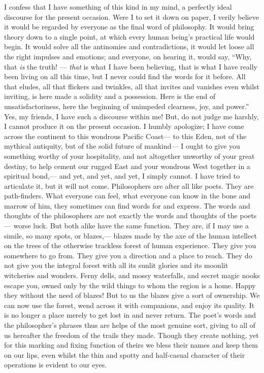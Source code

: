 \documentclass[12pt]{article}
\begin{document}
I confess that I have something of this kind in my mind, a perfectly ideal discourse for the present occasion. Were I to set it down on paper, I verily believe it would be regarded by everyone as the final word of philosophy. It would bring theory down to a single point, at which every human being's practical life would begin. It would solve all the antinomies and contradictions, it would let loose all the right impulses and emotions; and everyone, on hearing it, would say, ``Why, that \emph{is} the truth! --- \emph{that} is what I have been believing, that is what I have really been living on all this time, but I never could find the words for it before. All that eludes, all that flickers and twinkles, all that invites and vanishes even whilst inviting, is here made a solidity and a possession. Here is the end of unsatisfactoriness, here the beginning of unimpeded clearness, joy, and power.'' Yes, my friends, I have such a discourse within me! But, do not judge me harshly, I cannot produce it on the present occasion. I humbly apologize; I have come across the continent to this wondrous Pacific Coast--- to this Eden, not of the mythical antiquity, but of the solid future of mankind--- I ought to give you something worthy of your hospitality, and not altogether unworthy of your great destiny, to help cement our rugged East and your wondrous West together in a spiritual bond,--- and yet, and yet, and yet, I simply cannot. I have tried to articulate it, but it will not come. Philosophers are after all like poets. They are path-finders. What everyone can feel, what everyone can know in the bone and marrow of him, they sometimes can find words for and express. The words and thoughts of the philosophers are not exactly the words and thoughts of the poets--- worse luck. But both alike have the same function. They are, if I may use a simile, so many spots, or blazes,--- blazes made by the axe of the human intellect on the trees of the otherwise trackless forest of human experience. They give you somewhere to go from. They give you a direction and a place to reach. They do not give you the integral forest with all its sunlit glories and its moonlit witcheries and wonders. Ferny dells, and mossy waterfalls, and secret magic nooks escape you, owned only by the wild things to whom the region is a home. Happy they without the need of blazes! But to us the blazes give a sort of ownership. We can now use the forest, wend across it with companions, and enjoy its quality. It is no longer a place merely to get lost in and never return. The poet's words and the philosopher's phrases thus are helps of the most genuine sort, giving to all of us hereafter the freedom of the trails they made. Though they create nothing, yet for this marking and fixing function of theirs we bless their names and keep them on our lips, even whilst the thin and spotty and half-casual character of their operations is evident to our eyes. 
\end{document}
